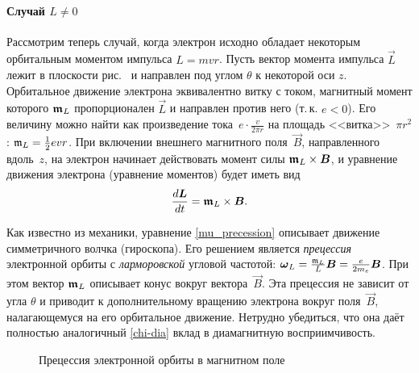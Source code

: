 \paragraph{Случай $L\ne0$}

Рассмотрим теперь случай, когда электрон исходно обладает некоторым
орбитальным моментом импульса $L=mvr$. 
Пусть вектор момента импульса $\vec{L}$ лежит в плоскости
рис.~ и направлен под углом $\theta$ к некоторой оси $z$.
Орбитальное движение электрона эквивалентно витку с током,
магнитный момент которого ${\boldsymbol{\mathfrak{m}}}_L$ пропорционален $\vec{L}$
и направлен против него (т.\,к. $e<0$).
Его величину можно найти как произведение тока~$e\cdot \frac{v}{2\pi r}$ 
на площадь <<витка>>~$\pi r^2$: $\mathfrak{m}_L= \frac12 evr$.
При включении внешнего магнитного поля~$\vec{B}$,
направленного вдоль~$z$, на электрон начинает
действовать момент силы ${\boldsymbol{\mathfrak{m}}}_L\times {\boldsymbol{B}}$,
и уравнение движения электрона (уравнение моментов) будет иметь вид
\begin{equation}
\eqmark{mu_precession}
	\frac{d\vec{L}}{dt} = \vec{\mm}_L\times \vec{B}.
\end{equation}

Как известно из механики, уравнение \eqref{mu_precession} 
описывает движение симметричного волчка (гироскопа). Его решением является
\emph{прецессия} электронной орбиты с \emph{ларморовской} угловой частотой:
${\boldsymbol{\omega}}_L = \frac{\mathfrak{m}_L }{L} {\boldsymbol{B}} = \frac{e}{2m_e}{\boldsymbol{B}}$.
При этом вектор ${\boldsymbol{\mathfrak{m}}}_L$ описывает конус вокруг вектора~$\vec{B}$.
Эта прецессия не зависит от угла $\theta$ и приводит к дополнительному 
вращению электрона вокруг поля~$\vec{B}$, налагающемуся на его орбитальное 
движение. Нетрудно убедиться, что она даёт полностью аналогичный 
\eqref{chi-dia} вклад в диамагнитную восприимчивость.

\begin{figure}[h!]
    \centering
    \caption{Прецессия электронной орбиты в магнитном поле}
\end{figure}

